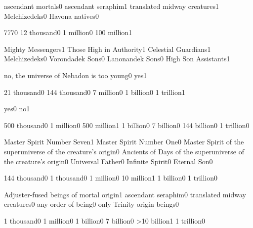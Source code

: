 {ascendant mortals}{0}
{ascendant seraphim}{1}
{translated midway creatures}{1}
{Melchizedeks}{0}
{Havona natives}{0}
\qstop

{777}{0}
{12 thousand}{0}
{1 million}{0}
{100 million}{1}
\qstop

{Mighty Messengers}{1}
{Those High in Authority}{1}
{Celestial Guardians}{1}
{Melchizedeks}{0}
{Vorondadek Sons}{0}
{Lanonandek Sons}{0}
{High Son Assistants}{1}
\qstop

{no, the universe of Nebadon is too young}{0}
{yes}{1}
\qstop

{21 thousand}{0}
{144 thousand}{0}
{7 million}{0}
{1 billion}{0}
{1 trillion}{1}
\qstop

{yes}{0}
{no}{1}
\qstop

{500 thousand}{0}
{1 million}{0}
{500 million}{1}
{1 billion}{0}
{7 billion}{0}
{144 billion}{0}
{1 trillion}{0}
\qstop

{Master Spirit Number Seven}{1}
{Master Spirit Number One}{0}
{Master Spirit of the superuniverse of the creature's origin}{0}
{Ancients of Days of the superuniverse of the creature's origin}{0}
{Universal Father}{0}
{Infinite Spirit}{0}
{Eternal Son}{0}
\qstop

{144 thousand}{0}
{1 thousand}{0}
{1 million}{0}
{10 million}{1}
{1 billion}{0}
{1 trillion}{0}
\qstop

{Adjuster-fused beings of mortal origin}{1}
{ascendant seraphim}{0}
{translated midway creatures}{0}
{any order of being}{0}
{only Trinity-origin beings}{0}
\qstop

{1 thousand}{0}
{1 million}{0}
{1 billion}{0}
{7 billion}{0}
{>10 billion}{1}
{1 trillion}{0}
\qstop

